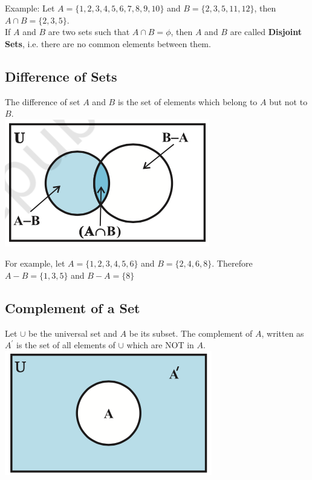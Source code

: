 \documentclass{book}
\begin{document}
		Example: Let $A = \{1,2,3,4,5,6,7,8,9,10\}$ and $B = \{2,3,5,11,12\}$, then $A \cap B = \{2,3,5\}$. \\
		
		If $A$ and $B$ are two sets such that $A \cap B = \phi$, then $A$ and $B$ are called \textbf{Disjoint Sets}, i.e. there are no common elements between them.
		
		\subsection{Difference of Sets}
		
		\begin{mdframed}[backgroundcolor=yellow]
			The difference of set $A$ and $B$ is the set of elements which belong to $A$ but not to $B$. \\
			\includegraphics[scale=0.6]{set4}
		\end{mdframed}
		For example, let $A = \{1,2,3,4,5,6\}$ and $B = \{2,4,6,8\}$. Therefore $A-B = \{1,3,5\}$ and $B-A = \{8\}$
		
		\subsection{Complement of a Set}
		\begin{mdframed}[backgroundcolor=yellow]
		Let $\cup$ be the universal set and $A$ be its subset. The complement of $A$, written as $A^{'}$ is the set of all elements of $\cup$ which are NOT in $A$. \\
		\includegraphics[scale=0.6]{set5}
		\end{mdframed}
		
\end{document}
